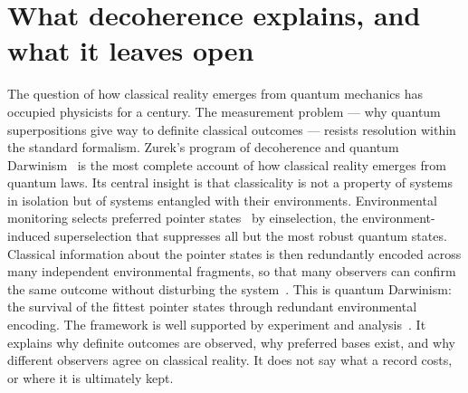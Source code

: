 \section{What decoherence explains, and what it leaves open}\label{sec:qr_zurek}
The question of how classical reality emerges from quantum mechanics has occupied physicists for a century. The measurement problem --- why quantum
superpositions give way to definite classical outcomes --- resists resolution within the standard formalism. Zurek's program of decoherence and quantum
Darwinism~\cite{Zurek1981,Zurek1991,Zurek2003,Zurek2009} is the most complete account of how classical reality emerges from quantum laws. Its central
insight is that classicality is not a property of systems in isolation but of systems entangled with their environments. Environmental monitoring
selects preferred pointer states~\cite{Zurek1981} by einselection, the environment-induced superselection that suppresses all but the most robust quantum
states. Classical information about the pointer states is then redundantly encoded across many independent environmental fragments, so that many
observers can confirm the same outcome without disturbing the system~\cite{Zurek2009}. This is quantum Darwinism: the survival of the fittest pointer
states through redundant environmental encoding. The framework is well supported by experiment and analysis~\cite{JoosZeh1985,Schlosshauer2005}. It
explains why definite outcomes are observed, why preferred bases exist, and why different observers agree on classical reality. It does not say what a
record costs, or where it is ultimately kept.

